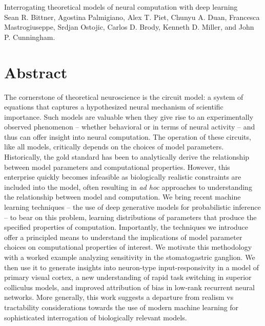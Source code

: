 \documentclass[11pt]{article}
\begin{document}
\medskip                        %

\thispagestyle{plain}
{\Large Interrogating theoretical models of neural computation with deep learning} \\
Sean R. Bittner, Agostina Palmigiano, Alex T. Piet, Chunyu A. Duan, Francesca Mastrogiuseppe, Srdjan Ostojic, Carlos D. Brody, Kenneth D. Miller, and John P. Cunningham.

\linenumbers
\section{Abstract}
The cornerstone of theoretical neuroscience is the circuit model: a system of equations that captures a hypothesized neural mechanism of scientific importance.  
Such models are valuable when they give rise to an experimentally observed phenomenon -- whether behavioral or in terms of neural activity -- and thus can offer insight into neural computation.  
The operation of these circuits, like all models, critically depends on the choices of model parameters.  
Historically, the gold standard has been to analytically derive the relationship between model parameters and computational properties.  
However, this enterprise quickly becomes infeasible as biologically realistic constraints are included into the model, often resulting in \emph{ad hoc} approaches to understanding the relationship between model and computation.  
We bring recent machine learning techniques -- the use of deep generative models for probabilistic inference -- to bear on this problem, learning distributions of parameters that produce the specified properties of computation.   
Importantly, the techniques we introduce offer a principled means to understand the implications of model parameter choices on computational properties of interest.  
We motivate this methodology with a worked example analyzing sensitivity in the stomatogastric ganglion.  
We then use it to generate insights into neuron-type input-responsivity in a model of primary visual cortex, a new understanding of rapid task switching in superior colliculus models, and improved attribution of bias in low-rank recurrent neural networks. 
More generally, this work suggests a departure from realism vs tractability considerations towards the use of modern machine learning for sophisticated interrogation of biologically relevant models.
\end{document}
